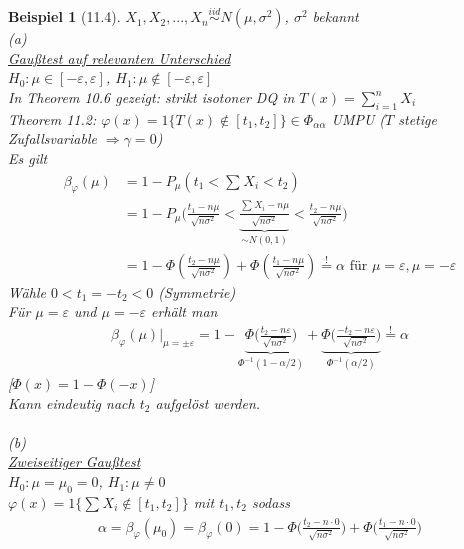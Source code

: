 \documentclass[a4paper,openany]{book}
\theoremstyle{mytheoremstyle}
\newtheorem*{bei}{Beispiel}
\theoremstyle{mytheoremstyle2}
\begin{document}
\begin{bei}[11.4]
  $X_1,X_2,...,X_n \overset{iid}\sim N(\mu ,\sigma ^2)$, $\sigma ^2$ bekannt \\
  (a) \\
  \underline{Gaußtest auf relevanten Unterschied}\\
  $H_0:\mu \in [-\varepsilon ,\varepsilon ]$, $H_1:\mu \notin [-\varepsilon ,\varepsilon ]$ \\
  In Theorem 10.6 gezeigt: strikt isotoner DQ in $T(x)=\sum_{i=1}^{n}{X_i}$ \\
  Theorem 11.2: $\varphi (x)=1\{T(x)\notin [t_1,t_2]\}\in \Phi _{\alpha \alpha }$  UMPU ($T$ stetige Zufallsvariable $\Rightarrow \gamma =0$)\\
  Es gilt 
  \begin{align*}
    \beta _{\varphi }(\mu  )
    &=1-P _{\mu } \left(t_1 < \sum_{}^{}{X_i}< t_2\right)\\
    &=1-P _{\mu }\bigg(\frac{t_1-n \mu }{\sqrt{n \sigma ^2}}<\underbrace{\frac{\sum_{}^{}{X_i}-n \mu }{\sqrt{n \sigma ^2}}}_{\sim N(0,1)}<\frac{t_2- n \mu }{\sqrt{n \sigma ^2}}\bigg)\\
    &=1- \Phi \left(\frac{t_2-n \mu }{\sqrt{n \sigma ^2}}\right)+\Phi \left(\frac{t_1-n \mu }{\sqrt{n \sigma ^2}}\right)\overset{!}=\alpha \text{ für }\mu =\varepsilon ,\mu =-\varepsilon 
  \end{align*}
  Wähle $0<t_1=-t_2<0$ (Symmetrie)\\
  Für $\mu =\varepsilon $ und $\mu =-\varepsilon $ erhält man 
  \begin{align*}
    \beta _{\varphi }(\mu )\bigg|_{\mu =\pm \varepsilon }^{}=1-\underbrace{\Phi\bigg(\frac{t_2-n \varepsilon  }{\sqrt{n \sigma ^2}}\bigg)}_{\Phi ^{-1}(1-\alpha /2)}+\underbrace{\Phi\bigg(\frac{-t_2-n \varepsilon  }{\sqrt{n \sigma ^2}}\bigg)}_{\Phi ^{-1}(\alpha /2)}\overset{!}=\alpha 
  \end{align*}
  [$\Phi(x)=1-\Phi(-x)$]\\
  Kann eindeutig nach $t_2$ aufgelöst werden. \\\\
  (b) \\
  \underline{Zweiseitiger Gaußtest}\\
  $H_0:\mu =\mu _0=0$, $H_1:\mu \neq 0$ \\
  $\varphi (x)=1\{\sum_{}^{}{X_i}\notin [t_1,t_2]\}$ mit $t_1,t_2$ sodass
  \begin{align*}
    \alpha =\beta _{\varphi }(\mu _0)=\beta _{\varphi }(0)=1-\Phi\bigg(\frac{t_2-n \cdot 0}{\sqrt{n \sigma ^2}}\bigg)+\Phi \bigg(\frac{t_1-n \cdot 0}{\sqrt{n \sigma ^2}}\bigg)

\end{align*}
\end{bei}
\end{document}

